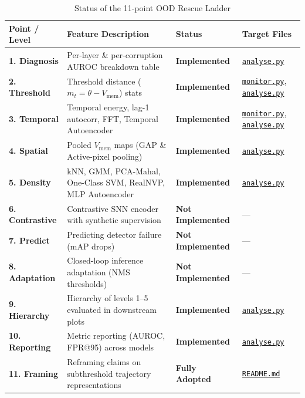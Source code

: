 \documentclass[11pt,a4paper]{article}
\begin{document}
\begin{table}[h!]
\centering
\caption{Status of the 11-point OOD Rescue Ladder}
\label{tab:status}
\vspace{0.2cm}
\small
\begin{tabular}{lp{5.5cm}lp{4.2cm}}
\toprule
\textbf{Point / Level} & \textbf{Feature Description} & \textbf{Status} & \textbf{Target Files} \\
\midrule
\textbf{1. Diagnosis} & Per-layer \& per-corruption AUROC breakdown table & \textcolor{green!60!black}{\textbf{Implemented}} & \href{run:analyse.py}{\texttt{analyse.py}} \\
\midrule
\textbf{2. Threshold} & Threshold distance ($m_t = \theta - V_{\text{mem}}$) stats & \textcolor{green!60!black}{\textbf{Implemented}} & \href{run:monitor.py}{\texttt{monitor.py}}, \href{run:analyse.py}{\texttt{analyse.py}} \\
\midrule
\textbf{3. Temporal} & Temporal energy, lag-1 autocorr, FFT, Temporal Autoencoder & \textcolor{green!60!black}{\textbf{Implemented}} & \href{run:monitor.py}{\texttt{monitor.py}}, \href{run:analyse.py}{\texttt{analyse.py}} \\
\midrule
\textbf{4. Spatial} & Pooled $V_{\text{mem}}$ maps (GAP \& Active-pixel pooling) & \textcolor{green!60!black}{\textbf{Implemented}} & \href{run:analyse.py}{\texttt{analyse.py}} \\
\midrule
\textbf{5. Density} & kNN, GMM, PCA-Mahal, One-Class SVM, RealNVP, MLP Autoencoder & \textcolor{green!60!black}{\textbf{Implemented}} & \href{run:analyse.py}{\texttt{analyse.py}} \\
\midrule
\textbf{6. Contrastive} & Contrastive SNN encoder with synthetic supervision & \textcolor{red!80!black}{\textbf{Not Implemented}} & — \\
\midrule
\textbf{7. Predict} & Predicting detector failure (mAP drops) & \textcolor{red!80!black}{\textbf{Not Implemented}} & — \\
\midrule
\textbf{8. Adaptation} & Closed-loop inference adaptation (NMS thresholds) & \textcolor{red!80!black}{\textbf{Not Implemented}} & — \\
\midrule
\textbf{9. Hierarchy} & Hierarchy of levels 1--5 evaluated in downstream plots & \textcolor{green!60!black}{\textbf{Implemented}} & \href{run:analyse.py}{\texttt{analyse.py}} \\
\midrule
\textbf{10. Reporting} & Metric reporting (AUROC, FPR@95) across models & \textcolor{green!60!black}{\textbf{Implemented}} & \href{run:analyse.py}{\texttt{analyse.py}} \\
\midrule
\textbf{11. Framing} & Reframing claims on subthreshold trajectory representations & \textcolor{green!60!black}{\textbf{Fully Adopted}} & \href{run:README.md}{\texttt{README.md}} \\
\bottomrule
\end{tabular}
\end{table}
\end{document}
